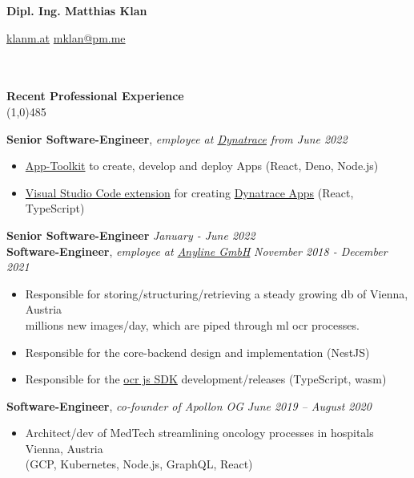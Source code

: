 \documentclass[9pt]{extarticle}
\newcommand\negativespace[1][-0.12cm]{\hspace*{#1}}
\begin{document}
\centerline{{\LARGE \bf Dipl. Ing. Matthias Klan}}
\centerline{\small \href{https://klanm.at}{klanm.at} \raisebox{0.25ex}{\tiny$\bullet$}  \href{mailto:mklan@pm.me}{mklan@pm.me}}


\noindent %
\\\\
\vspace*{-6pt}
{\negativespace \Large \bf Recent Professional Experience}\\
\line(1,0){485}
\\
\noindent

\noindent
{\bf Senior Software-Engineer}, \textit{employee at \href{https://dynatrace.com}{Dynatrace}}  \hfill \textit{from June 2022}
\begin{itemize}
\setlength\itemsep{0.05em}
\item \href{https://developer.dynatrace.com/reference/app-toolkit}{App-Toolkit} to create, develop and deploy Apps (React, Deno, Node.js)
\item \href{https://marketplace.visualstudio.com/items?itemName=dynatrace.dynatrace-apps}{Visual Studio Code extension} for creating \href{https://developer.dynatrace.com/getting-started/quickstart}{Dynatrace Apps} (React, TypeScript)\\
\end{itemize}

\noindent
{\bf Senior Software-Engineer}  \hfill \textit{January - June 2022} \\
{\bf Software-Engineer}, \textit{employee at \href{https://anyline.com}{Anyline GmbH}}  \hfill \textit{November 2018 - December 2021} 
\begin{itemize}
\setlength\itemsep{0.05em}
\item Responsible for storing/structuring/retrieving a steady growing db of  \hfill Vienna, Austria \\ 
millions new images/day, which are piped through ml ocr processes.
\item Responsible for the core-backend design and implementation (NestJS)
\item Responsible for the \href{https://github.com/Anyline/anyline-ocr-anylinejs-module}{ocr js SDK} development/releases (TypeScript, wasm) \\
\end{itemize}

\noindent
{\bf Software-Engineer}, \textit{co-founder of Apollon OG}  \hfill \textit{June 2019 -- August 2020}
\begin{itemize}
\setlength\itemsep{0.05em}
\item Architect/dev of MedTech streamlining oncology processes in hospitals \hfill Vienna, Austria \\
(GCP, Kubernetes, Node.js, GraphQL, React) \\
\end{itemize}
\end{document}
